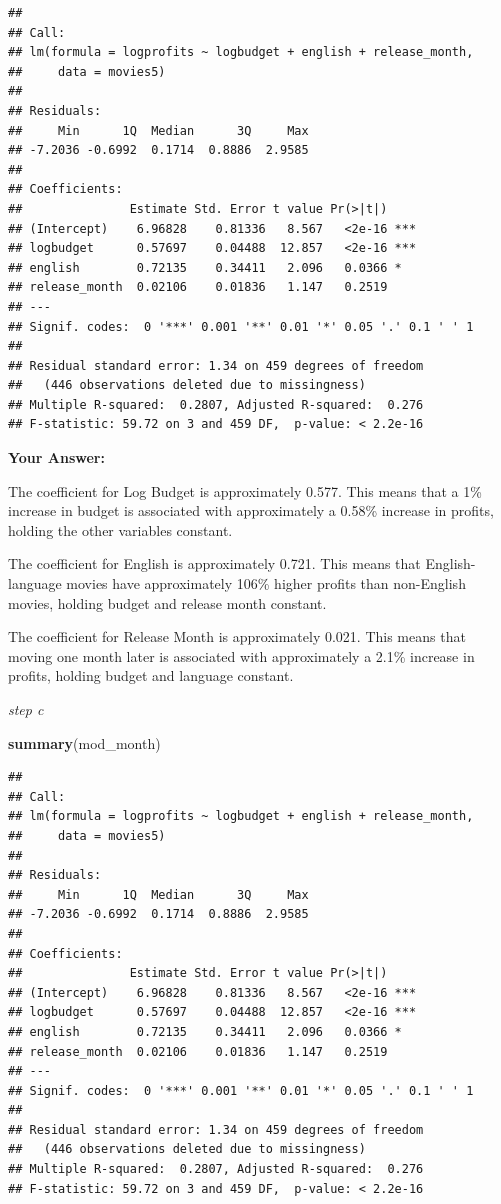 \documentclass[
]{article}
\newenvironment{Shaded}{\begin{snugshade}}{\end{snugshade}}
\newcommand{\FunctionTok}[1]{\textcolor[rgb]{0.13,0.29,0.53}{\textbf{#1}}}
\newcommand{\NormalTok}[1]{#1}
\begin{document}
\begin{verbatim}
## 
## Call:
## lm(formula = logprofits ~ logbudget + english + release_month, 
##     data = movies5)
## 
## Residuals:
##     Min      1Q  Median      3Q     Max 
## -7.2036 -0.6992  0.1714  0.8886  2.9585 
## 
## Coefficients:
##               Estimate Std. Error t value Pr(>|t|)    
## (Intercept)    6.96828    0.81336   8.567   <2e-16 ***
## logbudget      0.57697    0.04488  12.857   <2e-16 ***
## english        0.72135    0.34411   2.096   0.0366 *  
## release_month  0.02106    0.01836   1.147   0.2519    
## ---
## Signif. codes:  0 '***' 0.001 '**' 0.01 '*' 0.05 '.' 0.1 ' ' 1
## 
## Residual standard error: 1.34 on 459 degrees of freedom
##   (446 observations deleted due to missingness)
## Multiple R-squared:  0.2807, Adjusted R-squared:  0.276 
## F-statistic: 59.72 on 3 and 459 DF,  p-value: < 2.2e-16
\end{verbatim}

\textbf{Your Answer:}

The coefficient for Log Budget is approximately 0.577. This means that a
1\% increase in budget is associated with approximately a 0.58\%
increase in profits, holding the other variables constant.

The coefficient for English is approximately 0.721. This means that
English-language movies have approximately 106\% higher profits than
non-English movies, holding budget and release month constant.

The coefficient for Release Month is approximately 0.021. This means
that moving one month later is associated with approximately a 2.1\%
increase in profits, holding budget and language constant.

\emph{step c}

\begin{Shaded}
\begin{Highlighting}[]
\FunctionTok{summary}\NormalTok{(mod\_month)}
\end{Highlighting}
\end{Shaded}

\begin{verbatim}
## 
## Call:
## lm(formula = logprofits ~ logbudget + english + release_month, 
##     data = movies5)
## 
## Residuals:
##     Min      1Q  Median      3Q     Max 
## -7.2036 -0.6992  0.1714  0.8886  2.9585 
## 
## Coefficients:
##               Estimate Std. Error t value Pr(>|t|)    
## (Intercept)    6.96828    0.81336   8.567   <2e-16 ***
## logbudget      0.57697    0.04488  12.857   <2e-16 ***
## english        0.72135    0.34411   2.096   0.0366 *  
## release_month  0.02106    0.01836   1.147   0.2519    
## ---
## Signif. codes:  0 '***' 0.001 '**' 0.01 '*' 0.05 '.' 0.1 ' ' 1
## 
## Residual standard error: 1.34 on 459 degrees of freedom
##   (446 observations deleted due to missingness)
## Multiple R-squared:  0.2807, Adjusted R-squared:  0.276 
## F-statistic: 59.72 on 3 and 459 DF,  p-value: < 2.2e-16
\end{verbatim}
\end{document}
